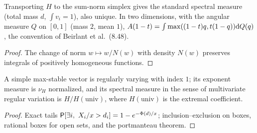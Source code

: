 \begin{theorem}
  \label{thm:max-stable-simplex}
  \leanok
  Transporting $H$ to the sum-norm simplex gives the standard spectral measure (total mass $d$, $\int v_i = 1$), also unique. In
  two dimensions, with the angular measure $Q$ on $[0,1]$ (mass $2$, mean $1$),
  $A(1-t) = \int \max((1-t)q, t(1-q)) \mathrm{d} Q(q)$, the convention of Beirlant et al.\ (8.48).
\end{theorem}
\begin{proof}
  \leanok
  The change of norm $w \mapsto w/N(w)$ with density $N(w)$ preserves integrals of positively homogeneous functions.
\end{proof}

\begin{theorem}
  \label{thm:max-stable-rv}
  \leanok
  A simple max-stable vector is regularly varying with index $1$; its exponent measure is $\nu_H$ normalized, and its spectral
  measure in the sense of multivariate regular variation is $H/H(\text{univ})$, where $H(\text{univ})$ is the extremal
  coefficient.
\end{theorem}
\begin{proof}
  \leanok
  Exact tails $\mathsf{P}[\exists i,\ X_i/x > d_i] = 1 - e^{-\Phi(d)/x}$; inclusion--exclusion on boxes, rational boxes for open sets, and
  the portmanteau theorem.
\end{proof}

